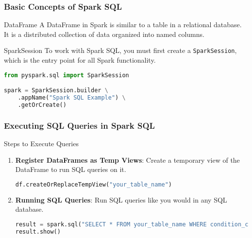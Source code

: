 \documentclass[aspectratio=169]{beamer}
\begin{document}
\begin{frame}[fragile]
    \frametitle{Basic Concepts of Spark SQL}
    \begin{block}{DataFrame}
        A DataFrame in Spark is similar to a table in a relational database. It is a distributed collection of data organized into named columns.
    \end{block}

    \begin{block}{SparkSession}
        To work with Spark SQL, you must first create a \texttt{SparkSession}, which is the entry point for all Spark functionality.
    \end{block}

    \begin{lstlisting}[language=Python]
from pyspark.sql import SparkSession

spark = SparkSession.builder \
    .appName("Spark SQL Example") \
    .getOrCreate()
    \end{lstlisting}
\end{frame}

\begin{frame}[fragile]
    \frametitle{Executing SQL Queries in Spark SQL}
    \begin{block}{Steps to Execute Queries}
        \begin{enumerate}
            \item \textbf{Register DataFrames as Temp Views}:
                Create a temporary view of the DataFrame to run SQL queries on it.
                \begin{lstlisting}[language=Python]
df.createOrReplaceTempView("your_table_name")
                \end{lstlisting}

            \item \textbf{Running SQL Queries}:
                Run SQL queries like you would in any SQL database.
                \begin{lstlisting}[language=Python]
result = spark.sql("SELECT * FROM your_table_name WHERE condition_column > value")
result.show()
                \end{lstlisting}
        \end{enumerate}
    \end{block}
\end{frame}
\end{document}
